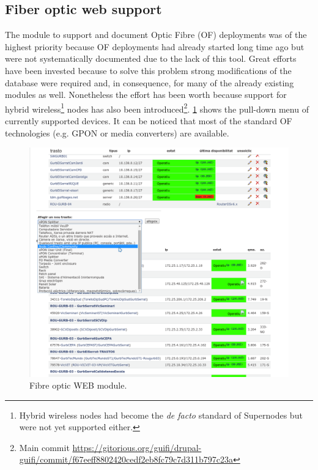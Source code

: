\subsection{Fiber optic web support}

The module to support and document Optic Fibre (OF) deployments was of the highest priority because OF deployments had already started long time ago but were not systematically documented due to the lack of this tool. Great efforts have been invested because to solve this problem strong modifications of the database were required and, in consequence, for many of the already existing modules as well. Nonetheless the effort has been worth because support for hybrid wireless\footnote{Hybrid wireless nodes had become the \emph{de facto} standard of Supernodes but were not yet supported either.} nodes has also been introduced\footnote{Main commit \url{https://gitorious.org/guifi/drupal-guifi/commit/f67eeff8802420cedf2eb8fc79c7d311b797c23a}}. \figurename \ref{fig:OF_sup} shows the pull-down menu of currently supported devices. It can be noticed that most of the standard OF technologies (e.g. GPON or media converters) are available.

\begin{figure}[H]
  \centering
  \includegraphics[width=0.95\linewidth]{sect2/figures/OF_support_crop.png}
  \caption[Fibre optic WEB module.]{Fibre optic WEB module.}
  \label{fig:OF_sup}
\end{figure}

